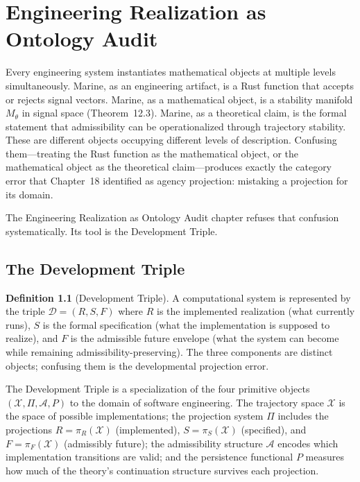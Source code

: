 \documentclass[12pt, oneside]{book}
\theoremstyle{flyxion}
\theoremstyle{definition}
\newtheorem{definition}[theorem]{Definition}
\begin{document}
\bigskip

\chapter{Engineering Realization as Ontology Audit}

Every engineering system instantiates mathematical
objects at multiple levels simultaneously. Marine,
as an engineering artifact, is a Rust function that
accepts or rejects signal vectors. Marine, as a
mathematical object, is a stability manifold
$M_\theta$ in signal space (Theorem~12.3). Marine,
as a theoretical claim, is the formal statement that
admissibility can be operationalized through
trajectory stability. These are different objects
occupying different levels of description. Confusing
them---treating the Rust function as the mathematical
object, or the mathematical object as the theoretical
claim---produces exactly the category error that
Chapter~18 identified as agency projection: mistaking
a projection for its domain.

The Engineering Realization as Ontology Audit chapter
refuses that confusion systematically. Its tool is
the Development Triple.

\section{The Development Triple}

\begin{definition}[Development Triple]
A computational system is represented by the triple
$\mathcal{D} = (R, S, F)$ where $R$ is the implemented
realization (what currently runs), $S$ is the formal
specification (what the implementation is supposed to
realize), and $F$ is the admissible future envelope
(what the system can become while remaining
admissibility-preserving). The three components are
distinct objects; confusing them is the developmental
projection error.
\end{definition}

The Development Triple is a specialization of the four
primitive objects $({\mathcal{X}}, \Pi, \mathcal{A}, P)$
to the domain of software engineering. The trajectory
space $\mathcal{X}$ is the space of possible
implementations; the projection system $\Pi$ includes
the projections $R = \pi_R(\mathcal{X})$ (implemented),
$S = \pi_S(\mathcal{X})$ (specified), and
$F = \pi_F(\mathcal{X})$ (admissibly future); the
admissibility structure $\mathcal{A}$ encodes which
implementation transitions are valid; and the
persistence functional $P$ measures how much of the
theory's continuation structure survives each
projection.
\end{document}

